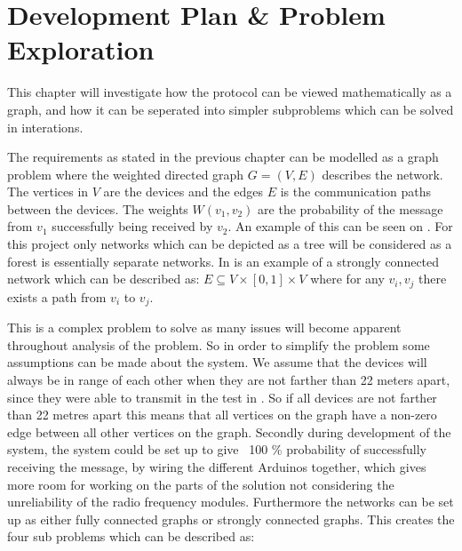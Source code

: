 \chapter{Development Plan \& Problem Exploration}
This chapter will investigate how the protocol can be viewed mathematically as a graph, and how it can be seperated into simpler subproblems which can be solved in interations.

\noindent The requirements as stated in the previous chapter can be modelled as a graph problem where the weighted directed graph $G = (V, E)$ describes the network. 
The vertices in $V$ are the devices and the edges $E$ is the communication paths between the devices. 
The weights $W(v_1, v_2)$ are the probability of the message from $v_1$ successfully being received by $v_2$.
An example of this can be seen on .
For this project only networks which can be depicted as a tree will be considered as a forest is essentially separate networks.
In  is an example of a strongly connected network which can be described as: $E \subseteq V \times [0,1] \times V$ where for any $v_i, v_j$ there exists a path from $v_i$ to $v_j$.


\noindent This is a complex problem to solve as many issues will become apparent throughout analysis of the problem.
So in order to simplify the problem some assumptions can be made about the system.
We assume that the devices will always be in range of each other when they are not farther than 22 meters apart, since they were able to transmit in the test in  .
So if all devices are not farther than 22 metres apart this means that all vertices on the graph have a non-zero edge between all other vertices on the graph.
Secondly during development of the system, the system could be set up to give ~100 \% probability of successfully receiving the message, by wiring the different Arduinos together, which gives more room for working on the parts of the solution not considering the unreliability of the radio frequency modules.
Furthermore the networks can be set up as either fully connected graphs or strongly connected graphs.
This creates the four sub problems which can be described as:  %

